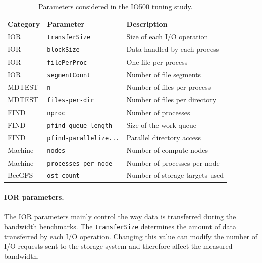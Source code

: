 \begin{table}[H]
\centering
\caption{Parameters considered in the IO500 tuning study.}
\label{tab:parameter-space}

\begin{tabular}{lll}
    \hline
    \rowcolor{gray!30}
    \textbf{Category} & \textbf{Parameter} & \textbf{Description} \\
    \hline

    
    IOR & \texttt{transferSize} & Size of each I/O operation \\
    IOR & \texttt{blockSize} & Data handled by each process \\
    IOR & \texttt{filePerProc} & One file per process \\
    
    IOR & \texttt{segmentCount} & Number of file segments \\
    \hline

    MDTEST & \texttt{n} & Number of files per process \\
    MDTEST & \texttt{files-per-dir} & Number of files per directory \\
    \hline

    FIND & \texttt{nproc} & Number of processes \\
    FIND & \texttt{pfind-queue-length} & Size of the work queue \\
    FIND & \texttt{pfind-parallelize...} & Parallel directory access \\
    \hline

    Machine & \texttt{nodes} & Number of compute nodes \\
    Machine & \texttt{processes-per-node} & Number of processes per node \\
    \hline

    BeeGFS & \texttt{ost\_count} & Number of storage targets used \\
    \hline
\end{tabular}


\end{table}



\paragraph{IOR parameters.}

The IOR parameters mainly control the way data is transferred during the
bandwidth benchmarks. The \texttt{transferSize} determines the amount of
data transferred by each I/O operation. Changing this value can modify the
number of I/O requests sent to the storage system and therefore affect the
measured bandwidth.

